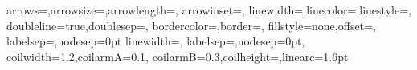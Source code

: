 %
    {arrows=\EdgeArrowSty,arrowsize=\EdgeArrowSZDim,arrowlength=\EdgeArrowSZNum,%
         arrowinset=\EdgeArrowIns,%
     linewidth=\EdgeLineDblCoef\EdgeLineWid,linecolor=\EdgeLineCol,linestyle=\EdgeLineSty,%
     doubleline=true,doublesep=\EdgeLineDblSep\EdgeLineWid,%
         bordercolor=\EdgeLineBorderColor,border=\EdgeLineBord,%
     fillstyle=none,offset=\EdgeOff,%
     labelsep=\TransLabelSP,nodesep=0pt}
%
   {linewidth=\ZZLineWid\EdgeLineWid,%
    labelsep=\TransLabelSP,nodesep=0pt,%
    coilwidth=1.2\ZZSiZ,coilarmA=0.1\ZZSiZ,%
    coilarmB=0.3\ZZSiZ,coilheight=\ZZShape,linearc=1.6pt}
\newcommand{\EdgeStyle}{\ifEdgeLineDbl\psset{style=VaucEdgeDblStyle}%
        \else\psset{style=VaucEdgeStyle}\fi}
\newcommand{\ZigzagStyle}%
   {\addtolength{\TransLabelSP}{\TransLabelZZCoef\ZZSiZ}%
    \psset{style=VaucZigzagStyle}%
        \addtolength{\TransLabelSP}{-\TransLabelZZCoef\ZZSiZ}%
        }
\newcommand{\ChgEdgeOffset}[1]{\setlength{\EdgeOff}{#1}}
\newcommand{\RstEdgeOffset}{\ChgEdgeOffset{\EdgeOffset}}
\newcommand{\SetEdgeOffset}[1]%
   {\setlength{\EdgeOffset}{#1}\RstEdgeOffset}
\newcommand{\ForthBackOffset}{%
   \setlength{\EdgeOff}{\ForthBackEdgeOffset\EdgeLineWid}}
%
\newcommand{\ChgArcAngle}[1]{\renewcommand{\VaucArcAng}{#1}}
\newcommand{\RstArcAngle}{\ChgArcAngle{\VaucArcAngle}}
\newcommand{\SetArcAngle}[1]%
   {\renewcommand{\VaucArcAngle}{#1}\RstArcAngle}
%
\newcommand{\ChgLArcAngle}[1]{\renewcommand{\VaucLArcAng}{#1}}
\newcommand{\RstLArcAngle}{\ChgLArcAngle{\VaucLArcAngle}}
\newcommand{\SetLArcAngle}[1]%
   {\renewcommand{\VaucLArcAngle}{#1}\RstLArcAngle}
%
\newcommand{\ChgArcCurvature}[1]{\renewcommand{\VaucArcCurv}{#1}}
\newcommand{\RstArcCurvature}{\ChgArcCurvature{\VaucArcCurvature}}
\newcommand{\SetArcCurvature}[1]%
   {\renewcommand{\VaucArcCurvature}{#1}\RstArcCurvature}
%
\newcommand{\ChgLArcCurvature}[1]{\renewcommand{\VaucLArcCurv}{#1}}
\newcommand{\RstLArcCurvature}{\ChgLArcCurvature{\VaucLArcCurvature}}
